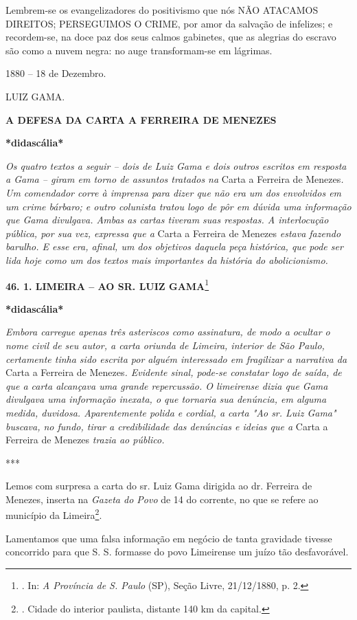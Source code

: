 Lembrem-se os evangelizadores do positivismo que nós NÃO ATACAMOS
DIREITOS; PERSEGUIMOS O CRIME, por amor da salvação de infelizes; e
recordem-se, na doce paz dos seus calmos gabinetes, que as alegrias do
escravo são como a nuvem negra: no auge transformam-se em lágrimas.

1880 -- 18 de Dezembro.

LUIZ GAMA.

\textbf{A DEFESA DA CARTA A
FERREIRA DE MENEZES}

\textbf{*didascália*}

\emph{Os quatro textos a seguir -- dois de Luiz Gama e dois outros
escritos em resposta a Gama -- giram em torno de assuntos tratados na}
Carta a Ferreira de Menezes\emph{. Um comendador corre à imprensa para
dizer que não era um dos envolvidos em um crime bárbaro; e outro
colunista tratou logo de pôr em dúvida uma informação que Gama
divulgava. Ambas as cartas tiveram suas respostas. A interlocução
pública, por sua vez, expressa que a} Carta a Ferreira de Menezes
\emph{estava fazendo barulho. E esse era, afinal, um dos objetivos
daquela peça histórica, que pode ser lida hoje como um dos textos mais
importantes da história do abolicionismo.}

\textbf{46. 1. LIMEIRA --
AO SR. LUIZ GAMA}\footnote{. In: \emph{A Província de S. Paulo} (SP),
  Seção Livre, 21/12/1880, p. 2.}

\textbf{*didascália*}

\emph{Embora carregue apenas três asteriscos como assinatura, de modo a
ocultar o nome civil de seu autor, a carta oriunda de Limeira, interior
de São Paulo, certamente tinha sido escrita por alguém interessado em
fragilizar a narrativa da} Carta a Ferreira de Menezes\emph{. Evidente
sinal, pode-se constatar logo de saída, de que a carta alcançava uma
grande repercussão. O limeirense dizia que Gama divulgava uma informação
inexata, o que tornaria sua denúncia, em alguma medida, duvidosa.
Aparentemente polida e cordial, a carta "Ao sr. Luiz Gama" buscava, no
fundo, tirar a credibilidade das denúncias e ideias que a} Carta a
Ferreira de Menezes \emph{trazia ao público. }

***

Lemos com surpresa a carta do sr. Luiz Gama dirigida ao dr. Ferreira de
Menezes, inserta na \emph{Gazeta do Povo} de 14 do corrente, no que se
refere ao município da Limeira\footnote{. Cidade do interior paulista,
  distante 140 km da capital.}.

Lamentamos que uma falsa informação em negócio de tanta gravidade
tivesse concorrido para que S. S. formasse do povo Limeirense um juízo
tão desfavorável.

